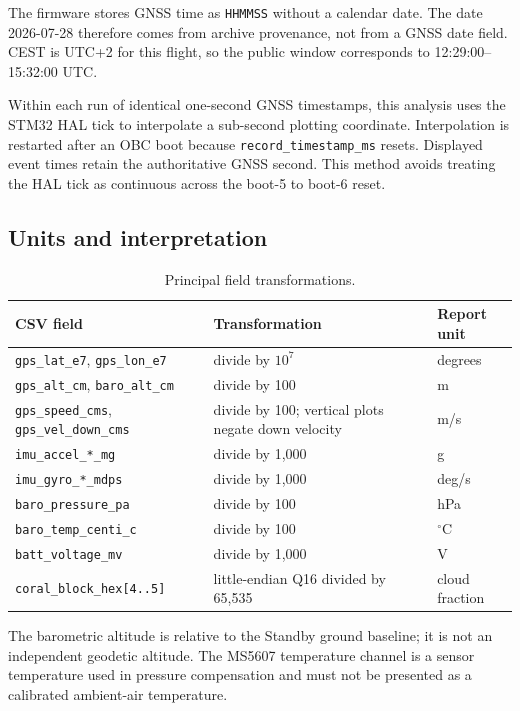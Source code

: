 \documentclass[11pt,a4paper]{article}
\begin{document}
The firmware stores GNSS time as \texttt{HHMMSS} without a calendar date. The
date 2026-07-28 therefore comes from archive provenance, not from a GNSS date
field. CEST is UTC+2 for this flight, so the public window corresponds to
12:29:00--15:32:00 UTC.

Within each run of identical one-second GNSS timestamps, this analysis uses the
STM32 HAL tick to interpolate a sub-second plotting coordinate. Interpolation
is restarted after an OBC boot because \texttt{record\_timestamp\_ms} resets.
Displayed event times retain the authoritative GNSS second. This method avoids
treating the HAL tick as continuous across the boot-5 to boot-6 reset.

\subsection{Units and interpretation}

\begin{table}[H]
\centering
\caption{Principal field transformations.}
\label{tab:scales}
\begin{tabularx}{\textwidth}{@{}lXl@{}}
\toprule
CSV field & Transformation & Report unit \\
\midrule
\texttt{gps\_lat\_e7}, \texttt{gps\_lon\_e7} & divide by $10^7$ & degrees \\
\texttt{gps\_alt\_cm}, \texttt{baro\_alt\_cm} & divide by 100 & m \\
\texttt{gps\_speed\_cms}, \texttt{gps\_vel\_down\_cms} & divide by 100; vertical plots negate down velocity & m/s \\
\texttt{imu\_accel\_*\_mg} & divide by 1,000 & g \\
\texttt{imu\_gyro\_*\_mdps} & divide by 1,000 & deg/s \\
\texttt{baro\_pressure\_pa} & divide by 100 & hPa \\
\texttt{baro\_temp\_centi\_c} & divide by 100 & $^\circ$C \\
\texttt{batt\_voltage\_mv} & divide by 1,000 & V \\
\texttt{coral\_block\_hex[4..5]} & little-endian Q16 divided by 65,535 & cloud fraction \\
\bottomrule
\end{tabularx}
\end{table}

The barometric altitude is relative to the Standby ground baseline; it is not
an independent geodetic altitude. The MS5607 temperature channel is a sensor
temperature used in pressure compensation and must not be presented as a
calibrated ambient-air temperature.
\end{document}

